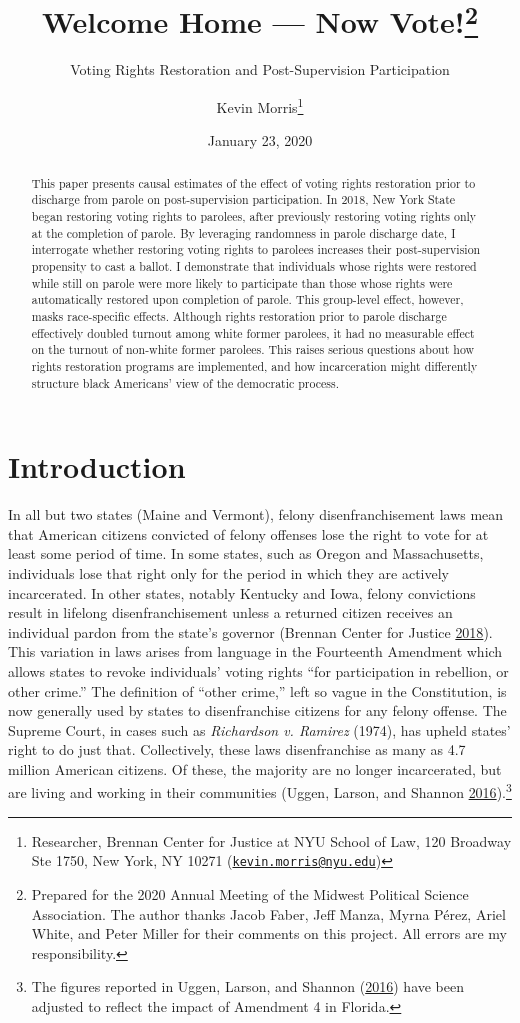 \documentclass[
  12pt,
]{article}
\title{Welcome Home --- Now Vote!\thanks{Prepared for the 2020 Annual Meeting of the Midwest Political Science Association. The author thanks Jacob Faber, Jeff Manza, Myrna Pérez, Ariel White, and Peter Miller for their comments on this project. All errors are my responsibility.}}
\subtitle{Voting Rights Restoration and Post-Supervision Participation}
\author{Kevin Morris\footnote{Researcher, Brennan Center for Justice at NYU School of Law, 120 Broadway Ste 1750, New York, NY 10271 (\href{mailto:kevin.morris@nyu.edu}{\nolinkurl{kevin.morris@nyu.edu}})}}
\date{January 23, 2020}
\begin{document}
\maketitle
\begin{abstract}
This paper presents causal estimates of the effect of voting rights restoration prior to discharge from parole on post-supervision participation. In 2018, New York State began restoring voting rights to parolees, after previously restoring voting rights only at the completion of parole. By leveraging randomness in parole discharge date, I interrogate whether restoring voting rights to parolees increases their post-supervision propensity to cast a ballot. I demonstrate that individuals whose rights were restored while still on parole were more likely to participate than those whose rights were automatically restored upon completion of parole. This group-level effect, however, masks race-specific effects. Although rights restoration prior to parole discharge effectively doubled turnout among white former parolees, it had no measurable effect on the turnout of non-white former parolees. This raises serious questions about how rights restoration programs are implemented, and how incarceration might differently structure black Americans' view of the democratic process.
\end{abstract}

\pagebreak


\hypertarget{introduction}{%
\section*{Introduction}\label{introduction}}

In all but two states (Maine and Vermont), felony disenfranchisement laws mean that American citizens convicted of felony offenses lose the right to vote for at least some period of time. In some states, such as Oregon and Massachusetts, individuals lose that right only for the period in which they are actively incarcerated. In other states, notably Kentucky and Iowa, felony convictions result in lifelong disenfranchisement unless a returned citizen receives an individual pardon from the state's governor (Brennan Center for Justice \protect\hyperlink{ref-bcj_laws}{2018}). This variation in laws arises from language in the Fourteenth Amendment which allows states to revoke individuals' voting rights ``for participation in rebellion, or other crime.'' The definition of ``other crime,'' left so vague in the Constitution, is now generally used by states to disenfranchise citizens for any felony offense. The Supreme Court, in cases such as \emph{Richardson v. Ramirez} (1974), has upheld states' right to do just that. Collectively, these laws disenfranchise as many as 4.7 million American citizens. Of these, the majority are no longer incarcerated, but are living and working in their communities (Uggen, Larson, and Shannon \protect\hyperlink{ref-sentencing_2016}{2016}).\footnote{The figures reported in Uggen, Larson, and Shannon (\protect\hyperlink{ref-sentencing_2016}{2016}) have been adjusted to reflect the impact of Amendment 4 in Florida.}
\end{document}
